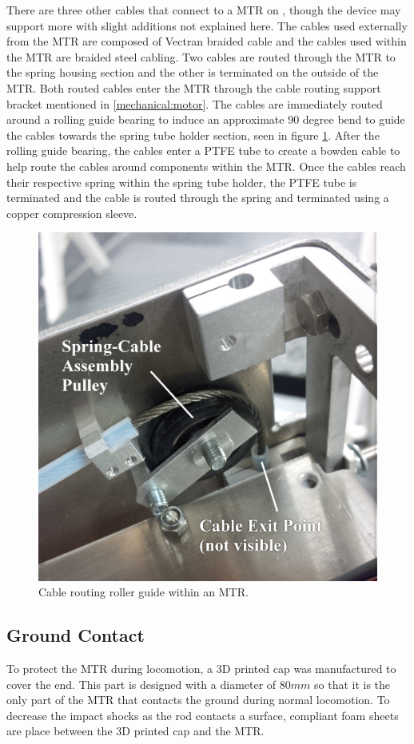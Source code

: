 There are three other cables that connect to a MTR on \SB{}, though the device may support more with slight additions not explained here.
The cables used externally from the MTR are composed of Vectran braided cable and the cables used within the MTR are braided steel cabling. 
Two cables are routed through the MTR to the spring housing section and the other is terminated on the outside of the MTR.
Both routed cables enter the MTR through the cable routing support bracket mentioned in \ref{mechanical:motor}.
The cables are immediately routed around a rolling guide bearing to induce an approximate 90 degree bend to guide the cables towards the spring tube holder section, seen in figure \ref{fig:roller_guide}.
After the rolling guide bearing, the cables enter a PTFE tube to create a bowden cable to help route the cables around components within the MTR.
Once the cables reach their respective spring within the spring tube holder, the PTFE tube is terminated and the cable is routed through the spring and terminated using a copper compression sleeve.

\begin{figure}[thpb]
      \centering
      \includegraphics[width=0.6\columnwidth]{tex/img/cable_pulley_bearing_labelled_fixedfonts}
      \caption{Cable routing roller guide within an MTR.}
      \label{fig:roller_guide}
\end{figure}

\subsection{Ground Contact} 
To protect the MTR during locomotion, a 3D printed cap was manufactured to cover the end.
This part is designed with a diameter of \(80mm\) so that it is the only part of the MTR that contacts the ground during normal locomotion.
To decrease the impact shocks as the rod contacts a surface, compliant foam sheets are place between the 3D printed cap and the MTR.

